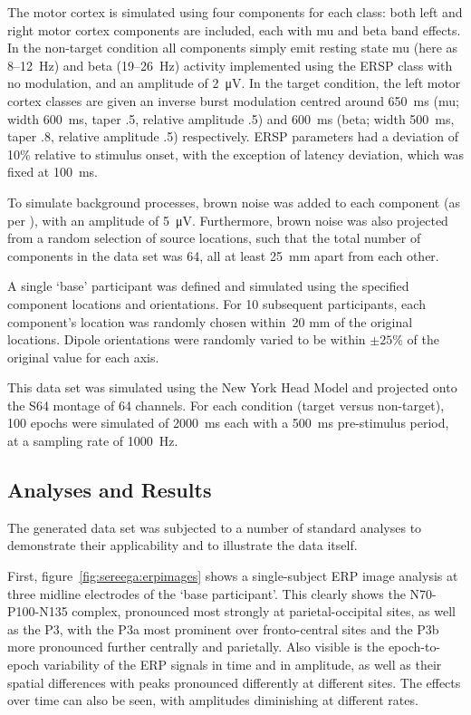 The motor cortex is simulated using four components for each class: both left and right motor cortex components are included, each with mu and beta band effects. In the non-target condition all components simply emit resting state mu (here as 8--12~Hz) and beta (19--26~Hz) activity implemented using the ERSP class with no modulation, and an amplitude of 2~\si{\micro\volt}. In the target condition, the left motor cortex classes are given an inverse burst modulation centred around 650~ms (mu; width 600~ms, taper .5, relative amplitude .5) and 600~ms (beta; width 500~ms, taper .8, relative amplitude .5) respectively. ERSP parameters had a deviation of 10\% relative to stimulus onset, with the exception of latency deviation, which was fixed at 100~ms.

To simulate background processes, brown noise was added to each component (as per ), with an amplitude of 5~\si{\micro\volt}. Furthermore, brown noise was also projected from a random selection of source locations, such that the total number of components in the data set was 64, all at least 25~mm apart from each other.

A single `base' participant was defined and simulated using the specified component locations and orientations. For 10 subsequent participants, each component's location was randomly chosen within~20 mm of the original locations. Dipole orientations were randomly varied to be within $\pm 25$\% of the original value for each axis. 

This data set was simulated using the New York Head Model and projected onto the S64 montage of 64 channels. For each condition (target versus non-target), 100 epochs were simulated of 2000~ms each with a 500~ms pre-stimulus period, at a sampling rate of 1000~Hz.


\subsection{Analyses and Results}

The generated data set was subjected to a number of standard analyses to demonstrate their applicability and to illustrate the data itself.

First, figure~\ref{fig:sereega:erpimages} shows a single-subject ERP image analysis at three midline electrodes of the `base participant'. This clearly shows the N70-P100-N135 complex, pronounced most strongly at parietal-occipital sites, as well as the P3, with the P3a most prominent over fronto-central sites and the P3b more pronounced further centrally and parietally. Also visible is the epoch-to-epoch variability of the ERP signals in time and in amplitude, as well as their spatial differences with peaks pronounced differently at different sites. The effects over time can also be seen, with amplitudes diminishing at different rates.

